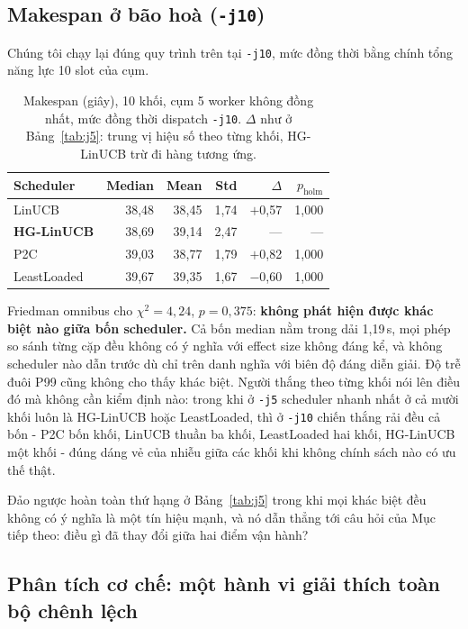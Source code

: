 \documentclass[final,5p,times,twocolumn]{elsarticle}
\begin{document}
\subsection{Makespan ở bão hoà (\texttt{-j10})}
\label{sec:j10}

Chúng tôi chạy lại đúng quy trình trên tại \texttt{-j10}, mức đồng thời bằng chính tổng năng lực 10 slot của cụm.

\begin{table}[t]
\centering
\caption{Makespan (giây), 10 khối, cụm 5 worker không đồng nhất, mức đồng thời dispatch \texttt{-j10}. $\Delta$ như ở Bảng~\ref{tab:j5}: trung vị hiệu số theo từng khối, HG-LinUCB trừ đi hàng tương ứng.}
\label{tab:j10}
\small
\begin{tabular}{lrrrrr}
\toprule
Scheduler & Median & Mean & Std & $\Delta$ & $p_{\text{holm}}$ \\
\midrule
LinUCB & 38,48 & 38,45 & 1,74 & $+$0,57 & 1,000 \\
\textbf{HG-LinUCB} & 38,69 & 39,14 & 2,47 & --- & --- \\
P2C & 39,03 & 38,77 & 1,79 & $+$0,82 & 1,000 \\
LeastLoaded & 39,67 & 39,35 & 1,67 & $-$0,60 & 1,000 \\
\bottomrule
\end{tabular}
\end{table}

Friedman omnibus cho $\chi^2=4{,}24$, $p=0{,}375$: \textbf{không phát hiện được khác biệt nào giữa bốn scheduler.} Cả bốn median nằm trong dải 1,19\,s, mọi phép so sánh từng cặp đều không có ý nghĩa với effect size không đáng kể, và không scheduler nào dẫn trước dù chỉ trên danh nghĩa với biên độ đáng diễn giải. Độ trễ đuôi P99 cũng không cho thấy khác biệt. Người thắng theo từng khối nói lên điều đó mà không cần kiểm định nào: trong khi ở \texttt{-j5} scheduler nhanh nhất ở cả mười khối luôn là HG-LinUCB hoặc LeastLoaded, thì ở \texttt{-j10} chiến thắng rải đều cả bốn - P2C bốn khối, LinUCB thuần ba khối, LeastLoaded hai khối, HG-LinUCB một khối - đúng dáng vẻ của nhiễu giữa các khối khi không chính sách nào có ưu thế thật.

Đảo ngược hoàn toàn thứ hạng ở Bảng~\ref{tab:j5} trong khi mọi khác biệt đều không có ý nghĩa là một tín hiệu mạnh, và nó dẫn thẳng tới câu hỏi của Mục tiếp theo: điều gì đã thay đổi giữa hai điểm vận hành?

\subsection{Phân tích cơ chế: một hành vi giải thích toàn bộ chênh lệch}
\label{sec:mech}
\end{document}
